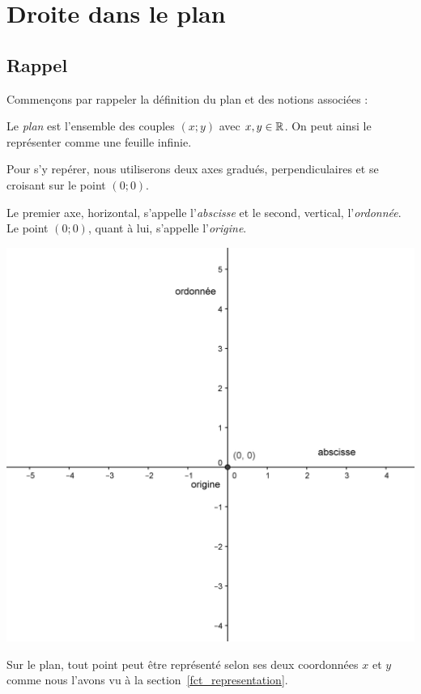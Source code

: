 \chapter{Droite dans le plan}\label{droite_plan}

\section{Rappel}

Commençons par rappeler la définition du plan et des notions associées :

\begin{definition}
Le \emph{plan} est l'ensemble des couples $(x;y)$ avec $x,y\in \mathbb{R}$. On peut ainsi le représenter comme une feuille infinie.

Pour s'y repérer, nous utiliserons deux axes gradués, perpendiculaires et se croisant sur le point $(0;0)$.

Le premier axe, horizontal, s'appelle l'\emph{abscisse} et le second, vertical, l'\emph{ordonnée}. Le point $(0;0)$, quant à lui, s'appelle l'\emph{origine}.
\end{definition}

\begin{center}
\includegraphics[width = 0.9 \textwidth]{droite/plan.png}
\end{center}

Sur le plan, tout point peut être représenté selon ses deux coordonnées $x$ et $y$ comme nous l'avons vu à la section~\ref{fct_representation}.


